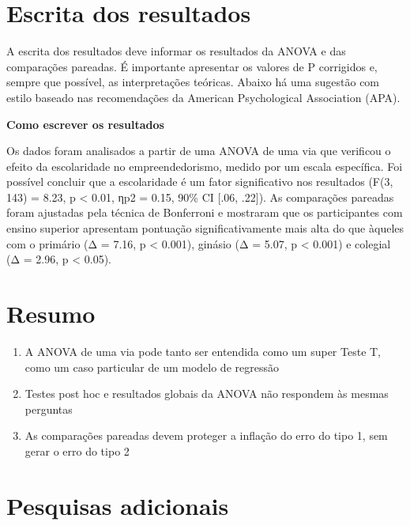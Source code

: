 \documentclass[
]{book}
\providecommand{\tightlist}{%
  \setlength{\itemsep}{0pt}\setlength{\parskip}{0pt}}
\begin{document}
\hypertarget{escrita-dos-resultados-5}{%
\section{Escrita dos resultados}\label{escrita-dos-resultados-5}}

A escrita dos resultados deve informar os resultados da ANOVA e das comparações pareadas. É importante apresentar os valores de P corrigidos e, sempre que possível, as interpretações teóricas. Abaixo há uma sugestão com estilo baseado nas recomendações da American Psychological Association (APA).

\textbf{Como escrever os resultados}

Os dados foram analisados a partir de uma ANOVA de uma via que verificou o efeito da escolaridade no empreendedorismo, medido por um escala específica. Foi possível concluir que a escolaridade é um fator significativo nos resultados (F(3, 143) = 8.23, p \textless{} 0.01, ηp2 = 0.15, 90\% CI {[}.06, .22{]}). As comparações pareadas foram ajustadas pela técnica de Bonferroni e mostraram que os participantes com ensino superior apresentam pontuação significativamente mais alta do que àqueles com o primário (Δ = 7.16, p \textless{} 0.001), ginásio (Δ = 5.07, p \textless{} 0.001) e colegial (Δ = 2.96, p \textless{} 0.05).

\hypertarget{resumo-9}{%
\section{Resumo}\label{resumo-9}}

\begin{enumerate}
\def\labelenumi{\arabic{enumi}.}
\tightlist
\item
  A ANOVA de uma via pode tanto ser entendida como um super Teste T, como um caso particular de um modelo de regressão\\
\item
  Testes post hoc e resultados globais da ANOVA não respondem às mesmas perguntas\\
\item
  As comparações pareadas devem proteger a inflação do erro do tipo 1, sem gerar o erro do tipo 2\\
\end{enumerate}

\hypertarget{pesquisas-adicionais-4}{%
\section{Pesquisas adicionais}\label{pesquisas-adicionais-4}}
\end{document}
